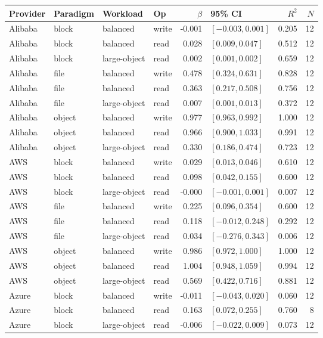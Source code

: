 \begin{tabular}{llllrlrr}
\toprule
Provider & Paradigm & Workload & Op & $\beta$ & 95\% CI & $R^2$ & $N$ \\
\midrule
Alibaba & block & balanced & write & -0.001 & $[-0.003, 0.001]$ & 0.205 & 12 \\
Alibaba & block & balanced & read & 0.028 & $[0.009, 0.047]$ & 0.512 & 12 \\
Alibaba & block & large-object & read & 0.002 & $[0.001, 0.002]$ & 0.659 & 12 \\
Alibaba & file & balanced & write & 0.478 & $[0.324, 0.631]$ & 0.828 & 12 \\
Alibaba & file & balanced & read & 0.363 & $[0.217, 0.508]$ & 0.756 & 12 \\
Alibaba & file & large-object & read & 0.007 & $[0.001, 0.013]$ & 0.372 & 12 \\
Alibaba & object & balanced & write & 0.977 & $[0.963, 0.992]$ & 1.000 & 12 \\
Alibaba & object & balanced & read & 0.966 & $[0.900, 1.033]$ & 0.991 & 12 \\
Alibaba & object & large-object & read & 0.330 & $[0.186, 0.474]$ & 0.723 & 12 \\
AWS & block & balanced & write & 0.029 & $[0.013, 0.046]$ & 0.610 & 12 \\
AWS & block & balanced & read & 0.098 & $[0.042, 0.155]$ & 0.600 & 12 \\
AWS & block & large-object & read & -0.000 & $[-0.001, 0.001]$ & 0.007 & 12 \\
AWS & file & balanced & write & 0.225 & $[0.096, 0.354]$ & 0.600 & 12 \\
AWS & file & balanced & read & 0.118 & $[-0.012, 0.248]$ & 0.292 & 12 \\
AWS & file & large-object & read & 0.034 & $[-0.276, 0.343]$ & 0.006 & 12 \\
AWS & object & balanced & write & 0.986 & $[0.972, 1.000]$ & 1.000 & 12 \\
AWS & object & balanced & read & 1.004 & $[0.948, 1.059]$ & 0.994 & 12 \\
AWS & object & large-object & read & 0.569 & $[0.422, 0.716]$ & 0.881 & 12 \\
Azure & block & balanced & write & -0.011 & $[-0.043, 0.020]$ & 0.060 & 12 \\
Azure & block & balanced & read & 0.163 & $[0.072, 0.255]$ & 0.760 & 8 \\
Azure & block & large-object & read & -0.006 & $[-0.022, 0.009]$ & 0.073 & 12 \\

\end{tabular}
